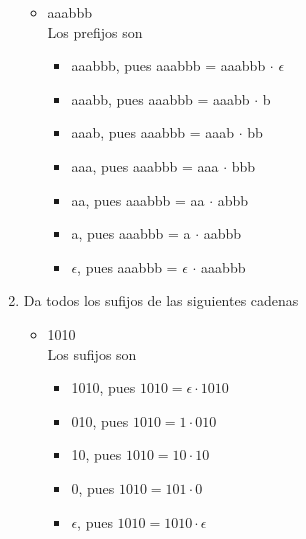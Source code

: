 \documentclass{article}
\begin{document}
\begin{enumerate}
{\begin{itemize}
            \item {
                aaabbb \\
                Los prefijos son 
                \begin{itemize}
                    \item {
                        aaabbb, pues aaabbb = aaabbb $\cdot$ $\epsilon$
                    }
                    \item {
                        aaabb, pues aaabbb = aaabb $\cdot$ b
                    }
                    \item {
                        aaab, pues aaabbb = aaab $\cdot$ bb 
                    }
                    \item {
                        aaa, pues aaabbb = aaa $\cdot$ bbb
                    }
                    \item {
                        aa, pues aaabbb = aa $\cdot$ abbb
                    }
                    \item {
                        a, pues aaabbb = a $\cdot$ aabbb
                    }
                    \item {
                        $\epsilon$, pues aaabbb = $\epsilon$ $\cdot$ aaabbb
                    }
                \end{itemize}
            }
        \end{itemize}
    }

    \item {
        Da todos los sufijos de las siguientes cadenas

        \begin{itemize}
            \item {
                1010 \\
                Los sufijos son 
                \begin{itemize}
                    \item {
                        1010, pues $1010 = \epsilon \cdot 1010$ 
                    }
                    \item {
                        010, pues $1010 = 1 \cdot 010$ 
                    }
                    \item {
                        10, pues $1010 = 10 \cdot 10$ 
                    }
                    \item {
                        0, pues $1010 = 101 \cdot 0$ 
                    }
                    \item {
                        $\epsilon$, pues $1010 = 1010 \cdot \epsilon$ 
                    }
                \end{itemize}
            }


\end{itemize}}
\end{enumerate}
\end{document}

